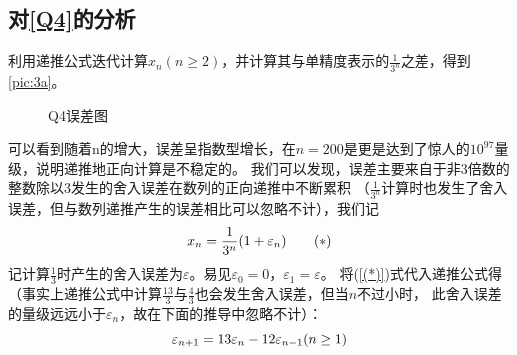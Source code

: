 \documentclass[a4paper,11pt,notitlepage]{article}
\begin{document}
\subsection{对\ref{Q4}的分析}
利用递推公式迭代计算$x_{n}(n\geq2)$，并计算其与单精度表示的$\frac{1}{3^{n}}$之差，得到\cref{pic:3a}。
\begin{figure}[H]
    \centering
    \caption{Q4误差图}
    \label{pic:3}
\end{figure}
\indent 可以看到随着n的增大，误差呈指数型增长，在$n=200$是更是达到了惊人的$10^{97}$量级，说明递推地正向计算是不稳定的。
我们可以发现，误差主要来自于非$3$倍数的整数除以$3$发生的舍入误差在数列的正向递推中不断累积
（$\frac{1}{3^{n}}$计算时也发生了舍入误差，但与数列递推产生的误差相比可以忽略不计），我们记
\begin{equation}
    \label{(*)}
    x_{n}=\frac{1}{3^{n}}(1+\varepsilon_{n})
    \tag{\textbf{$*$}}
\end{equation}
记计算$\frac{1}{3}$时产生的舍入误差为$\varepsilon$。易见$\varepsilon_{0}=0$，$\varepsilon_{1}=\varepsilon$。
将(\ref{(*)})式代入递推公式得（事实上递推公式中计算$\frac{13}{3}$与$\frac{4}{3}$也会发生舍入误差，但当$n$不过小时，
此舍入误差的量级远远小于$\varepsilon_{n}$，故在下面的推导中忽略不计）：
\begin{equation}
    \varepsilon_{n+1}=13\varepsilon_{n}-12\varepsilon_{n-1}(n\geq1)\notag
\end{equation}
\end{document}
